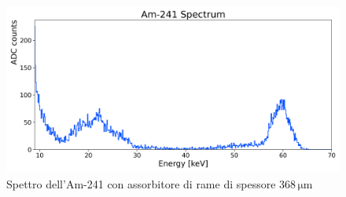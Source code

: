 \documentclass[twocolumn,10pt]{asme2ej}
\begin{document}
\begin{figure}[t]
    \centering
    \includegraphics[width=\linewidth]{../Plots/am_spectrum_absorber.png}
    \caption{Spettro dell'Am-241 con assorbitore di rame di spessore $368\,\si{\micro\metre}$}
    \label{i:spettro_abs}
    \vspace{-10pt}
\end{figure}
\end{document}
